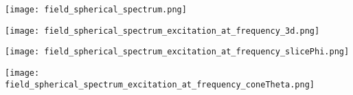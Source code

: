 \documentclass[a4paper]{scrartcl}
\begin{document}
  \texttt{[image: field\_spherical\_spectrum.png]}

  \texttt{[image: field\_spherical\_spectrum\_excitation\_at\_frequency\_3d.png]}

  \texttt{[image: field\_spherical\_spectrum\_excitation\_at\_frequency\_slicePhi.png]}

  \texttt{[image: field\_spherical\_spectrum\_excitation\_at\_frequency\_coneTheta.png]}
\end{document}
